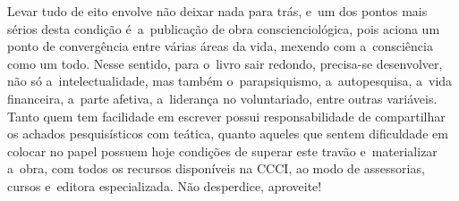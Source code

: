 \documentclass{gescons}
\begin{document}
\begin{multicols}{2}
Levar tudo de eito envolve não deixar nada para trás, e~um dos pontos mais sérios desta condição é~a~publicação de obra conscienciológica, pois aciona um ponto de convergência entre várias áreas da vida, mexendo com a~consciência como um todo. Nesse sentido, para o~livro sair redondo, precisa-se desenvolver, não só a~intelectualidade, mas também o~parapsiquismo, a~autopesquisa, a~vida financeira, a~parte afetiva, a~liderança no voluntariado, entre outras variáveis. Tanto quem tem facilidade em escrever possui responsabilidade de compartilhar os achados pesquisísticos com teática, quanto aqueles que sentem dificuldade em colocar no papel possuem hoje condições de superar este travão e~materializar a~obra, com todos os recursos disponíveis na CCCI, ao modo de assessorias, cursos e~editora especializada. Não desperdice, aproveite!

    \end{multicols}
\end{document}
